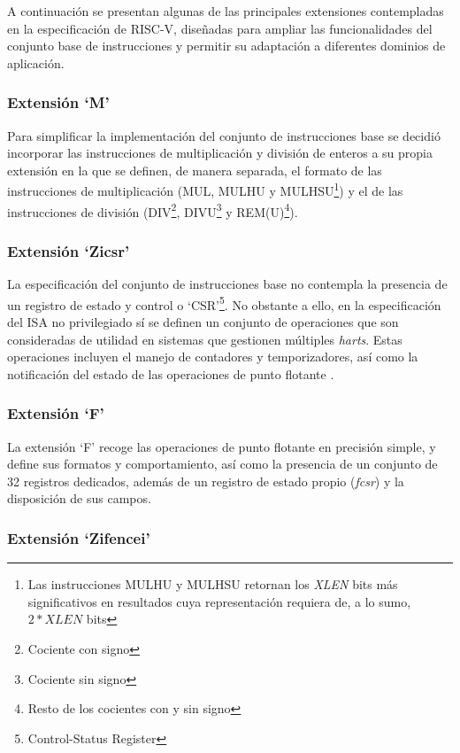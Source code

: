 A continuación se presentan algunas de las principales extensiones contempladas en la especificación de RISC-V, diseñadas para ampliar las funcionalidades del conjunto base de instrucciones y permitir su adaptación a diferentes dominios de aplicación.

\subsubsection{Extensión `M'}

Para simplificar la implementación del conjunto de instrucciones base se decidió incorporar las instrucciones de multiplicación y división de enteros a su propia extensión en la que se definen, de manera separada, el formato de las instrucciones de multiplicación (MUL, MULHU y MULHSU\footnote{Las instrucciones MULHU y MULHSU retornan los \textit{XLEN} bits más significativos en resultados cuya representación requiera de, a lo sumo, \(2 * XLEN\) bits}) y el de las instrucciones de división (DIV\footnote{Cociente con signo}, DIVU\footnote{Cociente sin signo} y REM(U)\footnote{Resto de los cocientes con y sin signo}).

\subsubsection{Extensión `Zicsr'}

La especificación del conjunto de instrucciones base no contempla la presencia de un registro de estado y control o `CSR'\footnote{Control-Status Register}. No obstante a ello, en la especificación del ISA no privilegiado sí se definen un conjunto de operaciones que son consideradas de utilidad en sistemas que gestionen múltiples \textit{harts}. Estas operaciones incluyen el manejo de contadores y temporizadores, así como la notificación del estado de las operaciones de punto flotante \cite{riscv-unpriv-isa-20250508-zicsr}.

\subsubsection{Extensión `F'}

La extensión `F' recoge las operaciones de punto flotante en precisión simple, y define sus formatos y comportamiento, así como la presencia de un conjunto de 32 registros dedicados, además de un registro de estado propio (\textit{fcsr}) y la disposición de sus campos.

\subsubsection{Extensión `Zifencei'}

